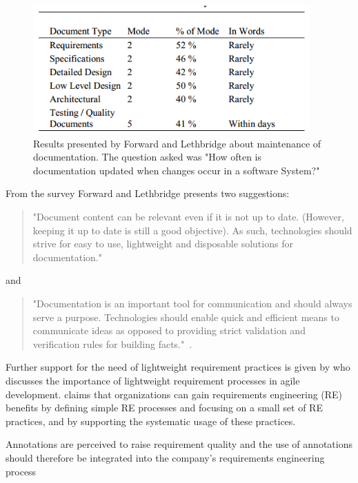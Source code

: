 \begin{figure}[h]
\centering
\includegraphics[width = 300pt, keepaspectratio = true]{fig/letforward2}
\caption{Results presented by Forward and Lethbridge about maintenance of documentation. The question asked was "How often is documentation updated when changes occur in a software System?"~\citep{forward2002}}
\label{fig:forward}
\end{figure}
\FloatBarrier

From the survey Forward and Lethbridge presents two suggestions:
\begin{quotation}
"Document content can be relevant even if it is not up to 
date. (However, keeping it up to date is still a good objective). As such, technologies should strive for easy to use, lightweight and disposable solutions for documentation."~\citep{forward2002}
\end{quotation}

and

\begin{quotation}
"Documentation is an important tool for communication and should always serve a purpose. Technologies should enable quick and efficient means to communicate ideas as opposed to providing strict validation and verification rules for building facts."~\citep{forward2002}.
\end{quotation}

Further support for the need of lightweight requirement practices is given by \citet{zhang2010towards} who discusses the importance of lightweight requirement processes in agile development. 
\citet{kauppinen2004implementing} claims that organizations can gain requirements engineering (RE) benefits by defining simple RE processes and focusing on a small set of RE practices, and by supporting the systematic usage of these practices.

Annotations are perceived to raise requirement quality and the use of annotations should therefore be integrated into the company's requirements engineering process


